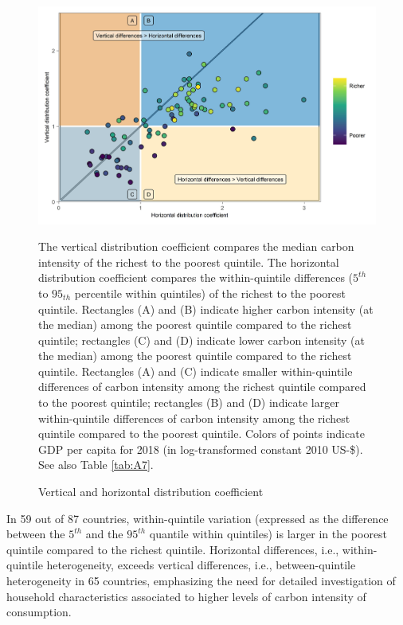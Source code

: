 \documentclass[12pt, a4paper]{article}
\newenvironment{subcaption}
{\strut
\vspace{-5pt}
\begin{minipage}[b]{0.9\textwidth}
  \hspace*{-\parindent}
  \footnotesize}
 {\end{minipage}}
\begin{document}
\begin{figure}[ht!]
    \centering
    \includegraphics{Figure 2/Figure_2}
    \caption{Vertical and horizontal distribution coefficient}
    \label{fig:fig_2}
    \begin{subcaption}
    The vertical distribution coefficient compares the median carbon intensity of the richest to the poorest quintile. The horizontal distribution coefficient compares the within-quintile differences ($5^{th}$ to $95_{th}$ percentile within quintiles) of the richest to the poorest quintile. Rectangles (A) and (B) indicate higher carbon intensity (at the median) among the poorest quintile compared to the richest quintile; rectangles (C) and (D) indicate lower carbon intensity (at the median) among the poorest quintile compared to the richest quintile. Rectangles (A) and (C) indicate smaller within-quintile differences of carbon intensity among the richest quintile compared to the poorest quintile; rectangles (B) and (D) indicate larger within-quintile differences of carbon intensity among the richest quintile compared to the poorest quintile. Colors of points indicate GDP per capita for 2018 (in log-transformed constant 2010 US-\$). See also Table \ref{tab:A7}.
    \end{subcaption}
\end{figure}

In 59 out of 87 countries, within-quintile variation (expressed as the difference between the $5^{th}$ and the $95^{th}$ quantile within quintiles) is larger in the poorest quintile compared to the richest quintile. Horizontal differences, i.e., within-quintile heterogeneity, exceeds vertical differences, i.e., between-quintile heterogeneity in 65 countries, emphasizing the need for detailed investigation of household characteristics associated to higher levels of carbon intensity of consumption.
\end{document}
